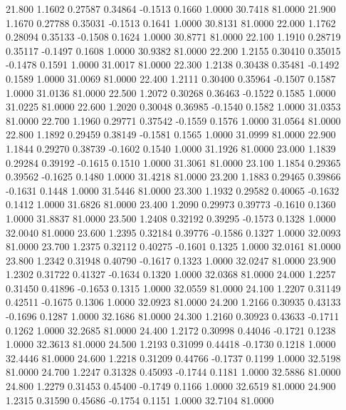   21.800   1.1602   0.27587   0.34864  -0.1513   0.1660   1.0000  30.7418  81.0000
  21.900   1.1670   0.27788   0.35031  -0.1513   0.1641   1.0000  30.8131  81.0000
  22.000   1.1762   0.28094   0.35133  -0.1508   0.1624   1.0000  30.8771  81.0000
  22.100   1.1910   0.28719   0.35117  -0.1497   0.1608   1.0000  30.9382  81.0000
  22.200   1.2155   0.30410   0.35015  -0.1478   0.1591   1.0000  31.0017  81.0000
  22.300   1.2138   0.30438   0.35481  -0.1492   0.1589   1.0000  31.0069  81.0000
  22.400   1.2111   0.30400   0.35964  -0.1507   0.1587   1.0000  31.0136  81.0000
  22.500   1.2072   0.30268   0.36463  -0.1522   0.1585   1.0000  31.0225  81.0000
  22.600   1.2020   0.30048   0.36985  -0.1540   0.1582   1.0000  31.0353  81.0000
  22.700   1.1960   0.29771   0.37542  -0.1559   0.1576   1.0000  31.0564  81.0000
  22.800   1.1892   0.29459   0.38149  -0.1581   0.1565   1.0000  31.0999  81.0000
  22.900   1.1844   0.29270   0.38739  -0.1602   0.1540   1.0000  31.1926  81.0000
  23.000   1.1839   0.29284   0.39192  -0.1615   0.1510   1.0000  31.3061  81.0000
  23.100   1.1854   0.29365   0.39562  -0.1625   0.1480   1.0000  31.4218  81.0000
  23.200   1.1883   0.29465   0.39866  -0.1631   0.1448   1.0000  31.5446  81.0000
  23.300   1.1932   0.29582   0.40065  -0.1632   0.1412   1.0000  31.6826  81.0000
  23.400   1.2090   0.29973   0.39773  -0.1610   0.1360   1.0000  31.8837  81.0000
  23.500   1.2408   0.32192   0.39295  -0.1573   0.1328   1.0000  32.0040  81.0000
  23.600   1.2395   0.32184   0.39776  -0.1586   0.1327   1.0000  32.0093  81.0000
  23.700   1.2375   0.32112   0.40275  -0.1601   0.1325   1.0000  32.0161  81.0000
  23.800   1.2342   0.31948   0.40790  -0.1617   0.1323   1.0000  32.0247  81.0000
  23.900   1.2302   0.31722   0.41327  -0.1634   0.1320   1.0000  32.0368  81.0000
  24.000   1.2257   0.31450   0.41896  -0.1653   0.1315   1.0000  32.0559  81.0000
  24.100   1.2207   0.31149   0.42511  -0.1675   0.1306   1.0000  32.0923  81.0000
  24.200   1.2166   0.30935   0.43133  -0.1696   0.1287   1.0000  32.1686  81.0000
  24.300   1.2160   0.30923   0.43633  -0.1711   0.1262   1.0000  32.2685  81.0000
  24.400   1.2172   0.30998   0.44046  -0.1721   0.1238   1.0000  32.3613  81.0000
  24.500   1.2193   0.31099   0.44418  -0.1730   0.1218   1.0000  32.4446  81.0000
  24.600   1.2218   0.31209   0.44766  -0.1737   0.1199   1.0000  32.5198  81.0000
  24.700   1.2247   0.31328   0.45093  -0.1744   0.1181   1.0000  32.5886  81.0000
  24.800   1.2279   0.31453   0.45400  -0.1749   0.1166   1.0000  32.6519  81.0000
  24.900   1.2315   0.31590   0.45686  -0.1754   0.1151   1.0000  32.7104  81.0000
